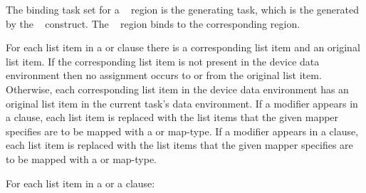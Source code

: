 \binding
The binding task set for a ~ region is the
generating task, which is the  generated
by the ~ construct. The ~
region binds to the corresponding  region.

\descr
For each list item in a  or  clause there is a corresponding 
list item and an original list item. If the corresponding list item is not present 
in the device data environment then no assignment occurs to or from the original 
list item. Otherwise, each corresponding list item in the device data environment 
has an original list item in the current task's data environment.  If a 
 modifier appears in a  clause, each list item is replaced 
with the list items that the given mapper specifies are to be mapped
with a  or  map-type. If a  modifier
appears in a  clause, each list item is replaced with the list items
that the given mapper specifies are to be mapped with a  or
 map-type.

For each list item in a  or a  clause: 

